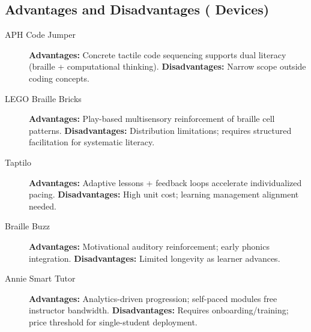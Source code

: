 \subsection*{Advantages and Disadvantages ( Devices)}
\begin{description}
	\item[APH Code Jumper] \textbf{Advantages:} Concrete tactile code sequencing supports dual literacy (braille + computational thinking). \textbf{Disadvantages:} Narrow scope outside coding concepts.
	\item[LEGO Braille Bricks] \textbf{Advantages:} Play-based multisensory reinforcement of braille cell patterns. \textbf{Disadvantages:} Distribution limitations; requires structured facilitation for systematic literacy.
	\item[Taptilo] \textbf{Advantages:} Adaptive lessons + feedback loops accelerate individualized pacing. \textbf{Disadvantages:} High unit cost; learning management alignment needed.
	\item[Braille Buzz] \textbf{Advantages:} Motivational auditory reinforcement; early phonics integration. \textbf{Disadvantages:} Limited longevity as learner advances.
	\item[Annie Smart Tutor] \textbf{Advantages:} Analytics-driven progression; self-paced modules free instructor bandwidth. \textbf{Disadvantages:} Requires onboarding/training; price threshold for single-student deployment.
\end{description}

